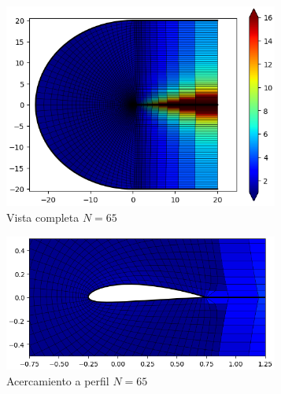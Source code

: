 \documentclass[letterpaper, openright, 12pt]{book}
\begin{document}
    \begin{figure}[htbp!]
        \centering
        \begin{subfigure}[c]{0.48\textwidth}
            \includegraphics[keepaspectratio, width=0.99\textwidth]
                {./img/naca4415_c_n_65_aspect_far}
            \caption{Vista completa $N=65$}
            \label{fig:naca4415_c_n_65_aspect_far}
        \end{subfigure}
        \hfill
        \begin{subfigure}[c]{0.48\textwidth}
            \includegraphics[keepaspectratio, width=0.99\textwidth]
                {./img/naca4415_c_n_65_aspect_close}
            \caption{Acercamiento a perfil $N=65$}
            \label{fig:naca4415_c_n_65_aspect_close}
        \end{subfigure}
        \begin{subfigure}[c]{0.48\textwidth}

\end{subfigure}
\end{figure}
\end{document}
